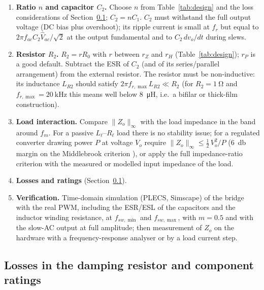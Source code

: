 \documentclass[11pt,a4paper]{article}
\begin{document}
\begin{enumerate}[leftmargin=*]
\item \textbf{Ratio $n$ and capacitor $C_2$.} Choose $n$ from Table~\ref{tab:design}
      and the loss considerations of Section~\ref{sec:losses}; $C_2 = n C_1$. $C_2$ must
      withstand the full output voltage (DC bias plus overshoot); its ripple current is
      small at $f_r$ but equal to $2\pi f_{ac} C_2 \hat V_{ac}/\sqrt 2$ at the output
      fundamental and to $C_2\,dv_o/dt$ during slews.

\item \textbf{Resistor $R_2$.} $R_2 = r R_0$ with $r$ between $r_Z$ and $r_H$
      (Table~\ref{tab:design}); $r_P$ is a good default. Subtract the ESR of $C_2$ (and
      of its series/parallel arrangement) from the external resistor. The resistor must be
      non-inductive: its inductance $L_{R2}$ should satisfy
      $2\pi f_{r,\max} L_{R2} \ll R_2$ (for $R_2 = \SI{1}{\ohm}$ and
      $f_{r,\max} = \SI{20}{\kilo\hertz}$ this means well below \SI{8}{\micro\henry}, i.e.\
      a bifilar or thick-film construction).

\item \textbf{Load interaction.} Compare $\|Z_o\|_\infty$ with the load impedance in the
      band around $f_m$. For a passive $L_\ell$--$R_\ell$ load there is no stability
      issue; for a regulated converter drawing power $P$ at voltage $V_o$ require
      $\|Z_o\|_\infty \le \tfrac12\,V_o^2/P$ (\SI{6}{\decibel} margin on the Middlebrook
      criterion \cite{Middlebrook1976,Feng2002}), or apply the full impedance-ratio
      criterion with the measured or modelled input impedance of the load.

\item \textbf{Losses and ratings} (Section~\ref{sec:losses}).

\item \textbf{Verification.} Time-domain simulation (PLECS, Simscape) of the bridge with
      the real PWM, including the ESR/ESL of the capacitors and the inductor winding
      resistance, at $f_{sw,\min}$ and $f_{sw,\max}$, with $m = 0.5$ and with the slow-AC
      output at full amplitude; then measurement of $Z_o$ on the hardware with a
      frequency-response analyser or by a load current step.
\end{enumerate}

\subsection{Losses in the damping resistor and component ratings}
\label{sec:losses}
\end{document}
